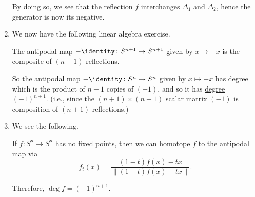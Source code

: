 \begin{remark}
\begin{enumerate}[(1)]
		      \begin{answer}
			      By doing so, we see that the reflection \(f\) interchanges \(\Delta _1\) and \(\Delta _2\), hence the generator is now its
			      negative.
		      \end{answer}
		\item We now have the following linear algebra exercise.
		      \begin{exercise}
			      The antipodal map \(-\identity_{}\colon S^{n + 1} \to S^{n + 1}\) given by \(x \mapsto -x\) is the composite of
			      \((n + 1)\) reflections.
		      \end{exercise}
		      So the antipodal map \(-\identity_{}\colon S^n \to S^n\) given by \(x \mapsto -x\) has \hyperref[def:degree]{degree} which is
		      the product of \(n + 1\) copies of \((-1)\), and so it has \hyperref[def:degree]{degree} \((-1)^{n + 1}\). (i.e., since the
		      \((n+1)\times (n+1)\) scalar matrix \((-1)\) is composition of \((n+1)\) reflections.)
		\item We see the following.
		      \begin{exercise}
			      If \(f\colon S^n \to S^n\) has no fixed points, then we can homotope \(f\) to the antipodal map via
			      \[
				      f_t(x) = \frac{(1 - t)f(x) - tx}{\left\lVert (1 - t)f(x) - tx\right\rVert}.
			      \]
		      \end{exercise}

		      Therefore, \(\deg f = (-1)^{n + 1}\).
	\end{enumerate}
\end{remark}